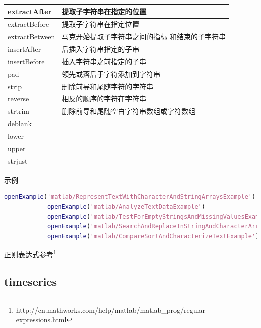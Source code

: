 \begin{longtable}{|l|l|}
            extractAfter & 提取子字符串在指定的位置\\\hline
            extractBefore &  提取子字符串在指定位置\\\hline
            extractBetween & 马克开始提取子字符串之间的指标 和结束的子字符串\\\hline
            insertAfter &  后插入字符串指定的子串\\\hline
            insertBefore & 插入字符串之前指定的子串\\\hline
            pad  & 领先或落后于字符添加到字符串\\\hline
            strip &  删除前导和尾随字符的字符串\\\hline
            reverse &  相反的顺序的字符在字符串\\\hline
            strtrim& 删除前导和尾随空白字符串数组或字符数组\\\hline
            deblank &{}\\\hline
            lower &{}\\\hline
            upper&{} \\\hline
            strjust &{}\\\hline
            \end{longtable}
            示例
                \begin{lstlisting}[language=Matlab]
            openExample('matlab/RepresentTextWithCharacterAndStringArraysExample')
            openExample('matlab/AnalyzeTextDataExample')
            openExample('matlab/TestForEmptyStringsAndMissingValuesExample')
            openExample('matlab/SearchAndReplaceInStringAndCharacterArraysExample')
            openExample('matlab/CompareSortAndCharacterizeTextExample')
                \end{lstlisting}
            正则表达式参考\footnote{http://cn.mathworks.com/help/matlab/matlab\_prog/regular-expressions.html}
    \subsection{timeseries}
